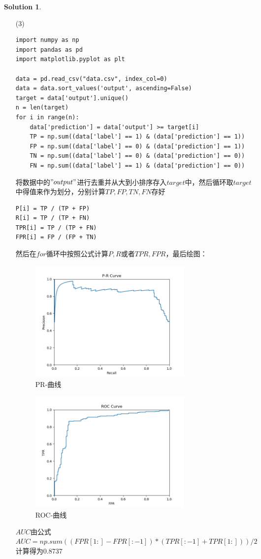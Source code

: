 \documentclass[a4paper,UTF8]{article}
\theoremstyle{definition}
\newtheorem*{solution}{Solution}
\begin{document}
\begin{solution}
	\begin{enumerate}
		\item [(3)]
		      \begin{lstlisting}
import numpy as np
import pandas as pd
import matplotlib.pyplot as plt

data = pd.read_csv("data.csv", index_col=0)
data = data.sort_values('output', ascending=False)
target = data['output'].unique()
n = len(target)
for i in range(n):
	data['prediction'] = data['output'] >= target[i]
	TP = np.sum((data['label'] == 1) & (data['prediction'] == 1))
	FP = np.sum((data['label'] == 0) & (data['prediction'] == 1))
	TN = np.sum((data['label'] == 0) & (data['prediction'] == 0))
	FN = np.sum((data['label'] == 1) & (data['prediction'] == 0))
	\end{lstlisting}
		      将数据中的$"output"$进行去重并从大到小排序存入$target$中，然后循环取$target$中得值来作为划分，分别计算$TP,FP,TN,FN$存好
		      \begin{lstlisting}
P[i] = TP / (TP + FP)
R[i] = TP / (TP + FN)
TPR[i] = TP / (TP + FN)
FPR[i] = FP / (FP + TN)
		\end{lstlisting}
		      然后在$for$循环中按照公式计算$P,R$或者$TPR,FPR$，最后绘图：
		      \begin{figure}[h]
			      \centering
			      \includegraphics[width=8cm,height=6cm]{PR.png}
			      \caption{PR-曲线}
		      \end{figure}
		      \begin{figure}[h]
			      \centering
			      \includegraphics[width=8cm,height=6cm]{ROC.png}
			      \caption{ROC-曲线}
		      \end{figure}
		      $AUC$由公式$AUC = np.sum((FPR[1:] - FPR[:-1]) * (TPR[:-1] + TPR[1:])) / 2$计算得为0.8737
	\end{enumerate}
\end{solution}
\end{document}

